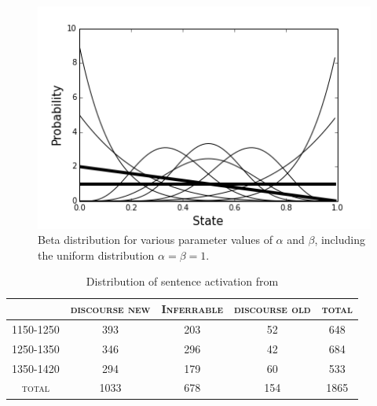 \documentclass[12pt]{upenndiss}
\theoremstyle{definition} \newtheorem{definition}{Definition}
\begin{document}
%
%
%

\begin{figure}
\centering
     \includegraphics[width=\textwidth]{beta-distribution.png}
\caption{Beta distribution for various parameter values of $\alpha$ and $\beta$, including the uniform distribution $\alpha = \beta = 1$.}
\label{beta-distribution}
\end{figure}

\begin{table}
\begin{tabular}{@{}cccc|c@{}}
\hline
       &\textsc{discourse new} & \textsc{Inferrable} & \textsc{discourse old} & \textsc{total}\\
\hline
1150-1250    & 393  & 203 & 52   & 648  \\
1250-1350    & 346  & 296 & 42   & 684\\
1350-1420    & 294  & 179 & 60   & 533\\ \hline
\textsc{total} &1033 & 678 & 154 & 1865 \\
\end{tabular}
\caption{Distribution of sentence activation from \cite{wallage2013}}
\end{table}
\end{document}
